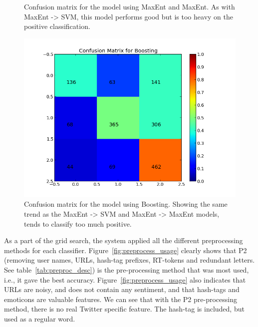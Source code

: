 \begin{minipage}[htb!]{\linewidth}
\begin{minipage}{0.45\linewidth}
\begin{figure}[H]
           \caption[Plot showing the confusion matrix for two-step MaxEnt -> MaxEnt]{Confusion matrix for the model using MaxEnt and MaxEnt. As with MaxEnt -> SVM, this model performs good but is too heavy on the positive classification.}
           \label{fig:confmat_maxent_maxent}
          \end{figure}
     \end{minipage}
\end{minipage}

\begin{minipage}[htb!]{\linewidth}
     \centering
     \begin{minipage}{0.45\linewidth}
	     \begin{figure}[H]
	          \includegraphics[width=\linewidth]{../img/plots/grid/confusion_matrix_Boosting.png}
	      \caption[Plot showing the confusion matrix for Boosting]{Confusion matrix for the model using Boosting. Showing the same trend as the MaxEnt -> SVM and MaxEnt -> MaxEnt models, tends to classify too much positive.}
	      \label{fig:confmat_boosting}
	     \end{figure}
     \end{minipage}
\end{minipage}



As a part of the grid search, the system applied all the different preprocessing methods for each classifier. Figure~\ref{fig:preprocess_usage} clearly shows that P2 (removing user names, URLs, hash-tag prefixes, RT-tokens and redundant letters. See table~\ref{tab:preproc_desc}) is the pre-processing method that was most used, i.e., it gave the best accuracy. Figure~\ref{fig:preprocess_usage} also indicates that URLs are noisy, and does not contain any sentiment, and that hash-tags and emoticons are valuable features. We can see that with the P2 pre-processing method, there is no real Twitter specific feature. The hash-tag is included, but used as a regular word.

